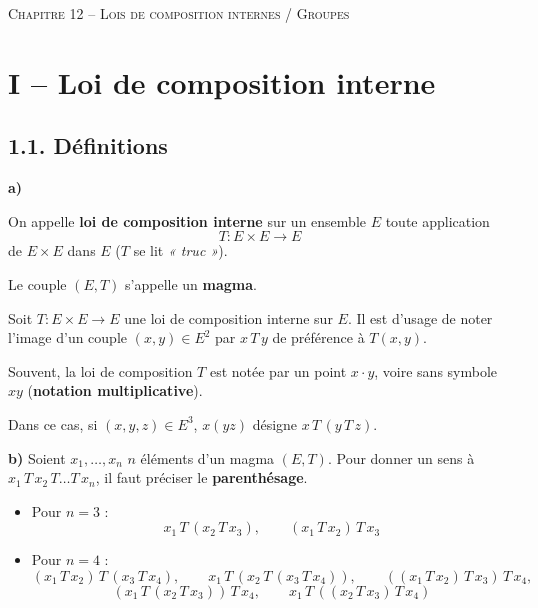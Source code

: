 \documentclass[a4paper,11pt]{article}
\newcommand{\mot}[1]{\textcolor{bordeaux}{\textbf{#1}}}
\begin{document}
\begin{center}
  {\Huge \scshape \color{bordeaux} Chapitre 12 -- Lois de composition internes / Groupes}
\end{center}
\vspace{10pt}

\section{I -- Loi de composition interne}

\subsection{1.1. Définitions}

\textbf{a)}
\begin{definition}
On appelle \mot{loi de composition interne} sur un ensemble $E$ toute application
\[
T : E \times E \longrightarrow E
\]
de $E \times E$ dans $E$ ($T$ se lit \textit{« truc »}).

Le couple $(E, T)$ s'appelle un \mot{magma}.
\end{definition}

\begin{remarque}
Soit $T : E \times E \to E$ une loi de composition interne sur $E$. Il est d'usage de noter l'image d'un couple $(x, y) \in E^2$ par $x \, T \, y$ de préférence à $T(x, y)$.

Souvent, la loi de composition $T$ est notée par un point $x \cdot y$, voire sans symbole $xy$ (\mot{notation multiplicative}).

Dans ce cas, si $(x, y, z) \in E^3$, $x(yz)$ désigne $x \, T \, (y \, T \, z)$.
\end{remarque}

\textbf{b)} Soient $x_1, \dots, x_n$ $n$ éléments d'un magma $(E, T)$. Pour donner un sens à $x_1 \, T \, x_2 \, T \dots T \, x_n$, il faut préciser le \mot{parenthésage}.

\begin{exemples}[Exemples]
\begin{itemize}
    \item Pour $n = 3$ :
    \[
    x_1 \, T \, (x_2 \, T \, x_3), \qquad (x_1 \, T \, x_2) \, T \, x_3
    \]
    \item Pour $n = 4$ :
    \[
    (x_1 \, T \, x_2) \, T \, (x_3 \, T \, x_4), \qquad x_1 \, T \, (x_2 \, T \, (x_3 \, T \, x_4)), \qquad ((x_1 \, T \, x_2) \, T \, x_3) \, T \, x_4,
    \]
    \[
    (x_1 \, T \, (x_2 \, T \, x_3)) \, T \, x_4, \qquad x_1 \, T \, ((x_2 \, T \, x_3) \, T \, x_4)
    \]
\end{itemize}
\end{exemples}
\end{document}
